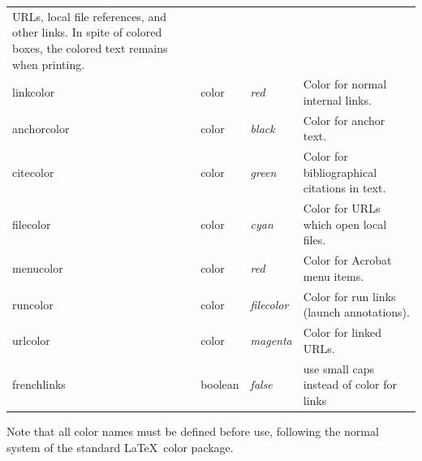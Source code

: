 \documentclass[pdftex]{article}
\begin{document}
\begin{longtable}{>{\ttfamily}ll>{\itshape}lp{6cm}}
                                     URLs, local file references, and other links.
                                     In spite of colored boxes, the colored
                                     text remains when printing.\\
linkcolor      & color   & red     & Color for normal internal links. \\
anchorcolor    & color   & black   & Color for anchor text. \\
citecolor      & color   & green   & Color for bibliographical citations in text. \\
filecolor      & color   & cyan    & Color for URLs which open local files. \\
menucolor      & color   & red     & Color for Acrobat menu items. \\
runcolor       & color   & filecolor & Color for run links (launch annotations). \\
urlcolor       & color   & magenta & Color for linked URLs. \\
frenchlinks    & boolean & false   & use small caps instead of color for links
\end{longtable} \smallskip

Note that all color names must be defined before use, following the
normal system of the standard \LaTeX\ \textsf{color} package.
\end{document}
